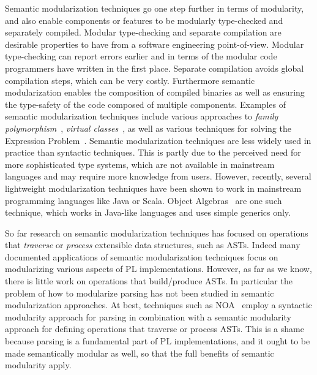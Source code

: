 Semantic modularization techniques go one step further in terms of modularity,
and also enable components or features to be modularly type-checked
and separately compiled. Modular type-checking and separate
compilation are desirable properties to have from a software
engineering point-of-view. Modular type-checking can report errors
earlier and in terms of the modular code programmers have written
in the first place. Separate compilation avoids global compilation
steps, which can be very costly. Furthermore semantic modularization
enables the composition of compiled binaries as well as ensuring the
type-safety of the code composed of multiple components. Examples of semantic modularization techniques
include various approaches to \emph{family polymorphism}~\cite{ernst01FP},
\emph{virtual classes}~\cite{Ernst:2006}, as
well as various techniques for solving the Expression
Problem~\cite{torgersen2004expression,odersky2005independently,Oliveira:2012,wang2016expression}.
Semantic modularization techniques are less widely used in practice
than syntactic techniques. This is partly due to the perceived need for more
sophisticated type systems, which are not available in mainstream
languages and may require more knowledge from users. However, recently,
several lightweight modularization techniques have been shown to work
in mainstream programming languages like Java or Scala. Object
Algebras~\cite{Oliveira:2012} are one such technique, which works in
Java-like languages and uses simple generics only.

So far research on semantic modularization techniques has focused on
operations that \emph{traverse} or \emph{process} extensible
data structures, such as ASTs. Indeed many documented applications of
semantic modularization techniques focus on modularizing various
aspects of PL implementations.  However, as far as we know, there is
little work on operations that build/produce ASTs.  In particular the
problem of how to modularize parsing has not been studied in semantic
modularization approaches. At best, techniques such as NOA~\cite{Gouseti2014}
employ a syntactic modularity approach for parsing in combination with
a semantic modularity approach for defining operations
that traverse or process ASTs. This is a shame because parsing is a
fundamental part of PL implementations, and it ought to be made
semantically modular as well, so that the full benefits of semantic
modularity apply.



